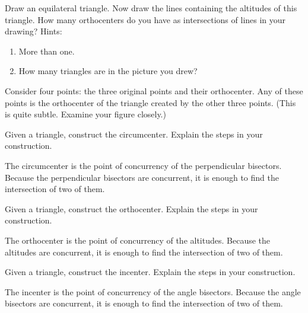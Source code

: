 \documentclass[nooutcomes]{ximera}
\begin{document}
\begin{problem}
Draw an equilateral triangle. Now draw the lines containing the
  altitudes of this triangle. How many orthocenters do you have as
  intersections of lines in your drawing? Hints:
\begin{enumerate}
\item More than one.
\item How many triangles are in the picture you drew?
\end{enumerate}
\begin{freeResponse}
\begin{hint}
Consider four points: the three original points and their orthocenter.  Any of these points is the orthocenter of the triangle created by the other three points.  (This is quite subtle.  Examine your figure closely.)
\end{hint}
\end{freeResponse}
\end{problem}

\begin{problem}
Given a triangle, construct the circumcenter. Explain the steps
  in your construction.
\begin{freeResponse}
\begin{hint}
The circumcenter is the point of concurrency of the perpendicular bisectors.  Because the perpendicular bisectors are concurrent, it is enough to find the intersection of two of them.  
\end{hint}
\end{freeResponse}
\end{problem}

\begin{problem}
Given a triangle, construct the orthocenter. Explain the steps
  in your construction.
\begin{freeResponse}
\begin{hint}
The orthocenter is the point of concurrency of the altitudes.  Because the altitudes are concurrent, it is enough to find the intersection of two of them.  
\end{hint}
\end{freeResponse}
\end{problem}

\begin{problem}
Given a triangle, construct the incenter. Explain the steps in
  your construction.
\begin{freeResponse}
\begin{hint}
The incenter is the point of concurrency of the angle bisectors.  Because the angle bisectors are concurrent, it is enough to find the intersection of two of them.  
\end{hint}
\end{freeResponse}
\end{problem}
\end{document}
